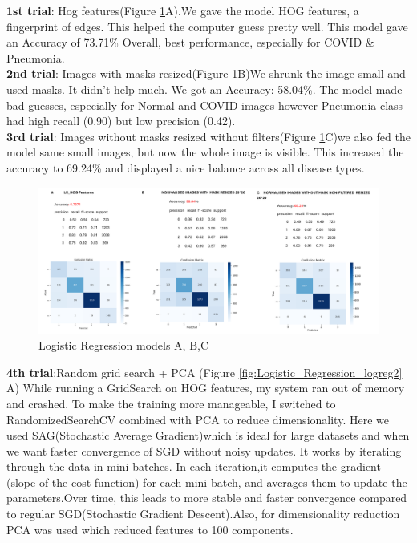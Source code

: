 \documentclass{article}
\begin{document}
\textbf{1st trial}: Hog features(Figure \ref{fig:Logistic_Regression}A).We gave the model HOG features, a fingerprint of edges. This helped the computer guess pretty well.
This model gave an Accuracy of 73.71\%
Overall, best performance, especially for COVID \& Pneumonia.
\\
\textbf{2nd trial}: Images with masks resized(Figure \ref{fig:Logistic_Regression}B)We shrunk the image small and used masks. It didn’t help much.
We got an Accuracy: 58.04\%. The model made bad guesses, especially for Normal and COVID images however Pneumonia class had high recall (0.90) but low precision (0.42).
\\
\textbf{3rd trial}: Images without masks resized without filters(Figure \ref{fig:Logistic_Regression}C)we also fed the model same small images, but now the whole image is visible. This increased the accuracy to 69.24\%  and displayed a nice balance across all disease types.
\\
\begin{figure}[H] %
    \centering
    \includegraphics[width=1.0\linewidth]{lr1,2,3.png}
    \caption{Logistic Regression models A, B,C}
    \label{fig:Logistic_Regression}
\end{figure}
\textbf{4th trial}:Random grid search + PCA (Figure \ref{fig:Logistic_Regression_logreg2} A)
While running a GridSearch on HOG features, my system ran out of memory and crashed. To make the training more manageable, I switched to RandomizedSearchCV combined with PCA to reduce dimensionality.
Here we used SAG(Stochastic Average Gradient)which is ideal for large datasets and when we want faster convergence of SGD without noisy updates. It works by iterating through the data in mini-batches. In each iteration,it computes the gradient (slope of the cost function) for each mini-batch, and averages them to update the parameters.Over time, this leads to more stable and faster convergence compared to regular SGD(Stochastic Gradient Descent).Also, for dimensionality reduction PCA was used which reduced features to 100 components.
\end{document}
